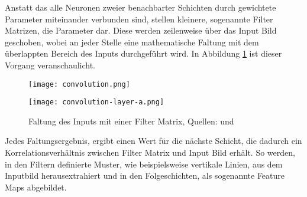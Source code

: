 Anstatt das alle Neuronen zweier benachbarter Schichten 
durch gewichtete Parameter miteinander verbunden sind, 
stellen kleinere, sogenannte Filter Matrizen, die 
Parameter dar.
Diese werden zeilenweise über das Input Bild 
geschoben, wobei an jeder Stelle eine mathematische 
Faltung mit dem überlappten Bereich des Inputs 
durchgeführt wird. In Abbildung \ref{fig:faltung}
ist dieser Vorgang veranschaulicht.

\vspace{1cm}
\begin{figure}[H]
    \centering
    \begin{minipage}{0.49\textwidth}
        \centering
        \texttt{[image: convolution.png]}
    \end{minipage}
    \begin{minipage}{0.49\textwidth}
        \centering
        \texttt{[image: convolution-layer-a.png]}
    \end{minipage}  
    \caption{Faltung des Inputs mit einer Filter Matrix,
    Quellen: \cite{researcherSimpleIntroductionConvolutional2019}
    und \cite{amidiSuperVIPCheatsheet2019}}
    \label{fig:faltung}
\end{figure}
\vspace{1cm}

Jedes Faltungsergebnis, ergibt einen Wert für 
die nächste Schicht, die dadurch 
ein Korrelationsverhältnis zwischen
Filter Matrix und Input Bild erhält.
So werden, in den Filtern definierte Muster, wie 
beispielsweise vertikale Linien, 
aus dem Inputbild herausextrahiert und in 
den Folgeschichten, als sogenannte Feature Maps
abgebildet.


